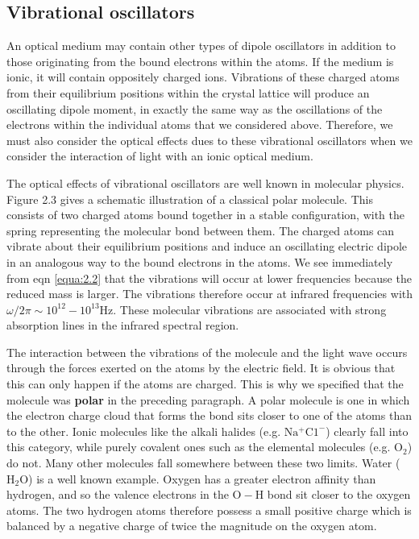 \documentclass[12pt]{book}
\begin{document}
\subsection{Vibrational oscillators}

An optical medium may contain other types of dipole oscillators in addition to those originating from the bound electrons within the atoms. If the medium is ionic, it will contain oppositely charged ions. Vibrations of these charged atoms from their equilibrium positions within the crystal lattice will produce an oscillating dipole moment, in exactly the same way as the oscillations of the electrons within the individual atoms that we considered above. Therefore, we must also consider the optical effects dues to these vibrational oscillators when we consider the interaction of light with an ionic optical medium.

The optical effects of vibrational oscillators are well known in molecular physics. Figure 2.3 gives a schematic illustration of a classical polar molecule. This consists of two charged atoms bound together in a stable configuration, with the spring representing the molecular bond between them. The charged atoms can vibrate about their equilibrium positions and induce an oscillating electric dipole in an analogous way to the bound electrons in the atoms. We see immediately from eqn \ref{equa:2.2} that the vibrations will occur at lower frequencies because the reduced mass is larger. The vibrations therefore occur at infrared frequencies with $\omega/{2\pi}\sim 10^{12}-10^{13}$Hz. These molecular vibrations are associated with strong absorption lines in the infrared spectral region.

The interaction between the vibrations of the molecule and the light wave occurs through the forces exerted on the atoms by the electric field. It is obvious that this can only happen if the atoms are charged. This is why we specified that the molecule was \textbf{polar} in the preceding paragraph. A polar molecule is one in which the electron charge cloud that forms the bond sits closer to one of the atoms than to the other. Ionic molecules like the alkali halides (e.g. $\mathrm{Na^+C1^-}$) clearly fall into this category, while purely covalent ones such as the elemental molecules (e.g. $\mathrm{O_2}$) do not. Many other molecules fall somewhere between these two limits. Water ($\mathrm{H_2O}$) is a well known example. Oxygen has a greater electron affinity than hydrogen, and so the valence electrons in the $\mathrm{O-H}$ bond sit closer to the oxygen atoms. The two hydrogen atoms therefore possess a small positive charge which is balanced by a negative charge of twice the magnitude on the oxygen atom.
\end{document}

